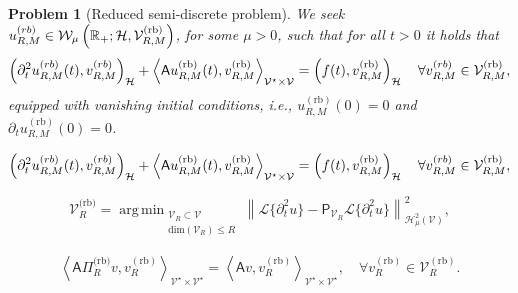 \documentclass[10pt,a4paper]{amsart}
\newtheorem{problem}{Problem}
\DeclareMathOperator*{\argmin}{arg\,min}
\newcommand{\cH}{\mathcal{H}}
\newcommand{\cV}{\mathcal{V}}
\newcommand{\cVrb}{\cV^\rb_R}
\newcommand{\dotp}[2]{\left ( #1,#2 \right )}
\newcommand{\dual}[2]{\left \langle #1,#2 \right \rangle}
\newcommand{\norm}[1]{\left \lVert #1 \right \rVert}
\newcommand{\rb}{{(\mathrm{rb})}}
\newcommand{\sfA}{\mathsf{A}}
\newcommand{\vrb}{v^\rb_R}
\begin{document}
\begin{problem}[Reduced semi-discrete problem] \label{pr:sdpr}
We seek $u^{\normalfont\textrm{(rb)}}_{R,M} \in \mathcal{W}_\mu\left(\mathbb{R}_+;\mathcal{H},\cV_{R,M}^\rb\right)$, for some $\mu>0$, such that for all $t>0$ it holds that
\begin{equation}\label{eq:semi_discrete_rom}
\begin{aligned}
	\dotp{
		\partial^2_t
		u_{R,M}^{\normalfont\textrm{(rb)}}(t)
	}{
		v_{R,M}^{\normalfont\textrm{(rb)}}
	}_{\mathcal{H}}
	+ 
    \dual{\sfA u_{R,M}^\rb(t)}{v_{R,M}^\rb}_{\cV^\star\times\cV} = \dotp{f(t)}{v_{R,M}^\rb}_\cH
	\quad
	\forall v_{R,M}^{\normalfont\textrm{(rb)}} \in \cV_{R,M}^\rb,
\end{aligned}
\end{equation}
equipped with vanishing initial conditions, i.e., 
$u_{R,M}^\rb(0)=0$ and $\partial_t u_{R,M}^\rb(0)=0$. 
\end{problem}

\begin{equation}
\begin{aligned}
	\dotp{
		\partial^2_t
		u_{R,M}^{\normalfont\textrm{(rb)}}(t)
	}{
		v_{R,M}^{\normalfont\textrm{(rb)}}
	}_{\mathcal{H}}
	+ 
    \dual{\sfA u_{R,M}^\rb(t)}{v_{R,M}^\rb}_{\cV^\star\times\cV} = \dotp{f(t)}{v_{R,M}^\rb}_\cH
	\quad
	\forall v_{R,M}^{\normalfont\textrm{(rb)}} \in \cV_{R,M}^\rb,
\end{aligned}
\end{equation}

\begin{equation}\label{eq:min_laplace_domain}
	\mathcal{V}^{\text{(rb)}}_R
	=
	\argmin_{
	\substack{
		\mathcal{V}_R \subset \mathcal{V}
		\\
		\text{dim}(\mathcal{V}_R)\leq R	
	}
	}	
	\norm{
		\mathcal{L}\{\partial^2_t u\}
		-
		\mathsf{P}_{\mathcal{V}_R}
		\mathcal{L}\{\partial^2_t u\}
	}^2_{\mathscr{H}^2_\mu(\mathcal{V})},
\end{equation}

\begin{align}\label{eq:elliptic_projection}
	\dual{
		\mathsf{A}
		\Pi^{\text{(rb)}}_R v
	}{
		\vrb
	}_{\mathcal{V}^\star \times \mathcal{V}^\star}
	=
	\dual{
		\mathsf{A} v
	}{
		\vrb
	}_{\mathcal{V}^\star \times \mathcal{V}^\star},
	\quad\forall \vrb\in\cVrb.
\end{align}
\end{document}
